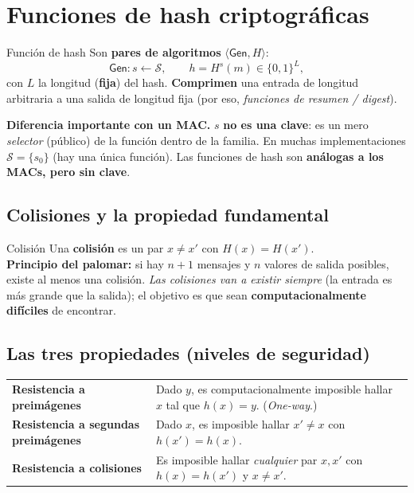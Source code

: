 \documentclass[11pt,a4paper]{article}
\newcommand{\Sset}{\mathcal{S}}
\newcommand{\Gen}{\mathsf{Gen}}
\begin{document}
\section{Funciones de hash criptográficas}

\begin{defbox}{Función de hash}
Son \textbf{pares de algoritmos} $\langle\Gen,H\rangle$:
\[
  \Gen:s\leftarrow\Sset,\qquad h=H^s(m)\in\{0,1\}^L,
\]
con $L$ la longitud (\textbf{fija}) del hash. \textbf{Comprimen} una entrada de longitud
arbitraria a una salida de longitud fija (por eso, \emph{funciones de resumen / digest}).
\end{defbox}

\begin{slidebox}
\textbf{Diferencia importante con un MAC.} $s$ \textbf{no es una clave}: es un mero
\emph{selector} (público) de la función dentro de la familia. En muchas implementaciones
$\Sset=\{s_0\}$ (hay una única función). Las funciones de hash son \textbf{análogas a los
MACs, pero sin clave}.
\end{slidebox}

\subsection{Colisiones y la propiedad fundamental}
\begin{defbox}{Colisión}
Una \textbf{colisión} es un par $x\neq x'$ con $H(x)=H(x')$.\\
\textbf{Principio del palomar:} si hay $n+1$ mensajes y $n$ valores de salida posibles,
existe al menos una colisión. \emph{Las colisiones van a existir siempre} (la entrada es más
grande que la salida); el objetivo es que sean \textbf{computacionalmente difíciles} de
encontrar.
\end{defbox}

\subsection{Las tres propiedades (niveles de seguridad)}
\begin{center}
\renewcommand{\arraystretch}{1.3}
\begin{tabular}{>{\bfseries}p{4.2cm} p{9.2cm}}
\toprule
Resistencia a preimágenes & Dado $y$, es computacionalmente imposible hallar $x$ tal que
$h(x)=y$. (\emph{One-way}.)\\
Resistencia a segundas preimágenes & Dado $x$, es imposible hallar $x'\neq x$ con
$h(x')=h(x)$.\\
Resistencia a colisiones & Es imposible hallar \emph{cualquier} par $x,x'$ con $h(x)=h(x')$ y
$x\neq x'$.\\
\bottomrule
\end{tabular}
\end{center}
\end{document}

